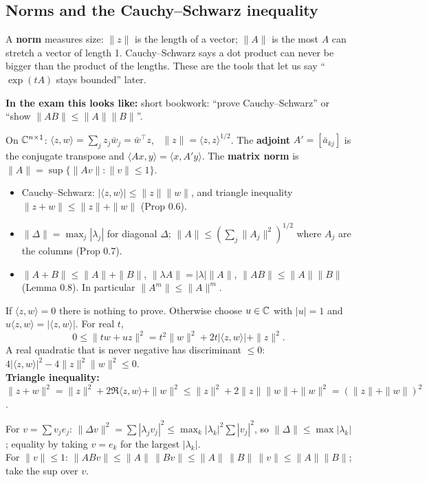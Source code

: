 \subsection{Norms and the Cauchy--Schwarz inequality \texorpdfstring{}{}}\label{ss:2-3}
\begin{plainbox}
A \textbf{norm} measures size: $\|z\|$ is the length of a vector; $\|A\|$ is the most $A$ can stretch a vector of length 1.
Cauchy--Schwarz says a dot product can never be bigger than the product of the lengths. These are the tools that let us say
``$\exp(tA)$ stays bounded'' later.
\par\smallskip\textbf{In the exam this looks like:} short bookwork: ``prove Cauchy--Schwarz'' or ``show $\|AB\|\le\|A\|\|B\|$''.
\end{plainbox}
\begin{defbox}
On $\mathbb{C}^{n\times1}$: $\langle z,w\rangle=\sum_j z_j\bar w_j=\bar w^\top z$, \ $\|z\|=\langle z,z\rangle^{1/2}$.
The \textbf{adjoint} $A'=[\bar a_{kj}]$ is the conjugate transpose and $\langle Ax,y\rangle=\langle x,A'y\rangle$.
The \textbf{matrix norm} is $\|A\|=\sup\{\|Av\|:\|v\|\le1\}$.
\end{defbox}
\begin{thmbox}
\begin{itemize}
\item Cauchy--Schwarz: $|\langle z,w\rangle|\le\|z\|\|w\|$, and triangle inequality $\|z+w\|\le\|z\|+\|w\|$ (Prop 0.6).
\item $\|\Delta\|=\max_j|\lambda_j|$ for diagonal $\Delta$; $\|A\|\le(\sum_j\|A_j\|^2)^{1/2}$ where $A_j$ are the columns (Prop 0.7).
\item $\|A+B\|\le\|A\|+\|B\|$, $\|\lambda A\|=|\lambda|\|A\|$, $\|AB\|\le\|A\|\|B\|$ (Lemma 0.8). In particular $\|A^m\|\le\|A\|^m$.
\end{itemize}
\end{thmbox}
\begin{proofbox}[title={Proof of Cauchy--Schwarz \fr{38}}]
If $\langle z,w\rangle=0$ there is nothing to prove. Otherwise choose $u\in\mathbb{C}$ with $|u|=1$ and $u\langle z,w\rangle=|\langle z,w\rangle|$. For real $t$,
\[0\le\|tw+uz\|^2=t^2\|w\|^2+2t|\langle z,w\rangle|+\|z\|^2.\]
A real quadratic that is never negative has discriminant $\le0$: $4|\langle z,w\rangle|^2-4\|z\|^2\|w\|^2\le0$. \\
\textbf{Triangle inequality:} $\|z+w\|^2=\|z\|^2+2\Re\langle z,w\rangle+\|w\|^2\le\|z\|^2+2\|z\|\|w\|+\|w\|^2=(\|z\|+\|w\|)^2$.
\end{proofbox}
\begin{proofbox}[title={Proof that $\|\Delta\|=\max|\lambda_j|$ and $\|AB\|\le\|A\|\|B\|$}]
For $v=\sum v_je_j$: $\|\Delta v\|^2=\sum|\lambda_jv_j|^2\le\max_k|\lambda_k|^2\sum|v_j|^2$, so $\|\Delta\|\le\max|\lambda_k|$; equality by taking $v=e_k$ for the largest $|\lambda_k|$.\\
For $\|v\|\le1$: $\|ABv\|\le\|A\|\,\|Bv\|\le\|A\|\,\|B\|\,\|v\|\le\|A\|\|B\|$; take the sup over $v$.
\end{proofbox}

